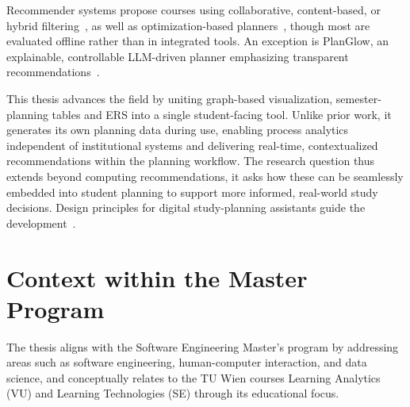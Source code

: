 \documentclass[paper=a4,fontsize=11pt,oneside,titlepage]{scrartcl}
\begin{document}
Recommender systems propose courses using collaborative, content-based, or hybrid filtering~\cite{bhumichitr_recommender_2017, wong_sequence_2018, esteban_helping_2020, al-badarenah_automated_2016, vuong_personalized_2019}, as well as optimization-based planners~\cite{srisamutr_course_2018}, though most are evaluated offline rather than in integrated tools. An exception is PlanGlow, an explainable, controllable LLM-driven planner emphasizing transparent recommendations~\cite{chun_planglow_2025}.

This thesis advances the field by uniting graph-based visualization, semester-planning tables and ERS into a single student-facing tool. Unlike prior work, it generates its own planning data during use, enabling process analytics independent of institutional systems and delivering real-time, contextualized recommendations within the planning workflow. The research question thus extends beyond computing recommendations, it asks how these can be seamlessly embedded into student planning to support more informed, real-world study decisions. Design principles for digital study-planning assistants guide the development~\cite{bartel_design_2024}.


\section{Context within the Master Program}
\label{sec:masterProgram}

The thesis aligns with the Software Engineering Master’s program by addressing  areas such as software engineering, human-computer interaction, and data science, and conceptually relates to the TU Wien courses Learning Analytics (VU) and Learning Technologies (SE) through its educational focus.
\newpage
\printbibliography
\end{document}
